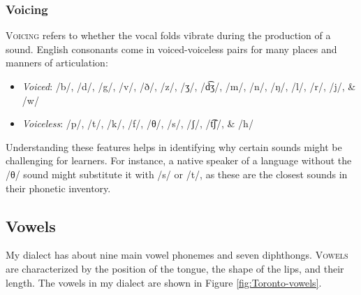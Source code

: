\subsubsection{Voicing}

\textsc{Voicing} refers to whether the vocal folds vibrate during the production of a sound. English consonants come in voiced-voiceless pairs for many places and manners of articulation:

\begin{itemize}[noitemsep]
    \item \textit{Voiced}: /b/, /d/, /g/, /v/, /ð/, /z/, /ʒ/, /d͡ʒ/, /m/, /n/, /ŋ/, /l/, /r/, /j/, \& /w/
    \item \textit{Voiceless}: /p/, /t/, /k/, /f/, /θ/, /s/, /ʃ/, /t͡ʃ/, \& /h/
\end{itemize}

Understanding these features helps in identifying why certain sounds might be challenging for learners. For instance, a native speaker of a language without the /θ/ sound might substitute it with /s/ or /t/, as these are the closest sounds in their phonetic inventory.

\subsection{Vowels}

My dialect has about nine main vowel phonemes and seven diphthongs. \textsc{Vowels} are characterized by the position of the tongue, the shape of the lips, and their length. The vowels in my dialect are shown in Figure \ref{fig:Toronto-vowels}.

